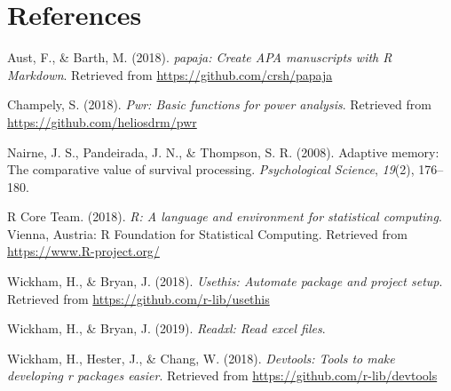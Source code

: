 \documentclass[man]{apa6}
\begin{document}
\newpage

\hypertarget{references}{%
\section{References}\label{references}}

\begingroup
\setlength{\parindent}{-0.5in}
\setlength{\leftskip}{0.5in}

\hypertarget{refs}{}
\leavevmode\hypertarget{ref-R-papaja}{}%
Aust, F., \& Barth, M. (2018). \emph{papaja: Create APA manuscripts with R Markdown}. Retrieved from \url{https://github.com/crsh/papaja}

\leavevmode\hypertarget{ref-R-pwr}{}%
Champely, S. (2018). \emph{Pwr: Basic functions for power analysis}. Retrieved from \url{https://github.com/heliosdrm/pwr}

\leavevmode\hypertarget{ref-nairne2008adaptive}{}%
Nairne, J. S., Pandeirada, J. N., \& Thompson, S. R. (2008). Adaptive memory: The comparative value of survival processing. \emph{Psychological Science}, \emph{19}(2), 176--180.

\leavevmode\hypertarget{ref-R-base}{}%
R Core Team. (2018). \emph{R: A language and environment for statistical computing}. Vienna, Austria: R Foundation for Statistical Computing. Retrieved from \url{https://www.R-project.org/}

\leavevmode\hypertarget{ref-R-usethis}{}%
Wickham, H., \& Bryan, J. (2018). \emph{Usethis: Automate package and project setup}. Retrieved from \url{https://github.com/r-lib/usethis}

\leavevmode\hypertarget{ref-R-readxl}{}%
Wickham, H., \& Bryan, J. (2019). \emph{Readxl: Read excel files}.

\leavevmode\hypertarget{ref-R-devtools}{}%
Wickham, H., Hester, J., \& Chang, W. (2018). \emph{Devtools: Tools to make developing r packages easier}. Retrieved from \url{https://github.com/r-lib/devtools}

\endgroup
\end{document}
